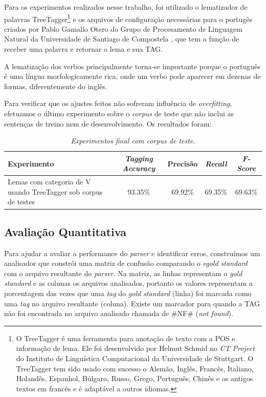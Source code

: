 Para os experimentos realizados nesse trabalho, foi utilizado o lematizador de palavras TreeTagger\footnote{O TreeTagger é uma ferramenta para anotação de texto com a POS e informação de lema. Ele foi desenvolvido por Helmut Schmid no \emph{CT Project} do Instituto de Linguística Computacional da Universidade de Stuttgart. O TreeTagger tem sido usado com sucesso o Alemão, Inglês, Francês, Italiano, Holandês, Espanhol, Búlgaro, Russo, Grego, Português, Chinês e os antigos textos em francês e é adaptável a outros idiomas.} \cite{treetagger} e os arquivos de configuração necessárias para o portugês criados por Pablo Gamallo Otero do Grupo de Procesamento de Linguagem Natural da Universidade de Santiago de Compostela \cite{gamallootero}, que tem a função de receber uma palavra e retornar o lema e sua TAG.

A lematização dos verbos principalmente torna-se importante porque o português é uma língua morfologicamente rica, onde um verbo pode aparecer em dezenas de formas, diferentemente do inglês.

Para verificar que os ajustes feitos não sofreram influência de \emph{overfitting}, efetuamos o último experimento sobre o \emph{corpus} de teste que não inclui as sentenças de treino nem de desenvolvimento. Os resultados foram:

\begin{table}[H]
\centering
\footnotesize
\caption{\it Experimentos final com \emph{corpus} de teste.}
	\begin{tabular}{|p{7cm}|c|c|c|c|}
		\hline
		\textbf{Experimento} &  \textbf{\emph{Tagging Accuracy}} & \textbf{Precisão} & \textbf{\emph{Recall}} & \textbf{\emph{F-Score}} \\
		\hline
		Lemas com categoria de V usando TreeTagger sob corpus de testes & 93.35\% & 69.92\% & 69.35\% & 69.63\%\\
		\hline		
	\end{tabular}
	\label{tab:experimento_corpus_teste}
\end{table}

\subsection{Avaliação Quantitativa}

Para ajudar a avaliar a performance do \emph{parser} e identificar erros, construímos um analisador que constrói uma matriz de confusão comparando o \emph{egold standard} com o arquivo resultante do \emph{parser}. Na matriz, as linhas representam o \emph{gold standard} e as colunas os arquivos analisados, portanto os valores representam a porcentagem das vezes que uma \emph{tag} do \emph{gold standard} (linha) foi marcada como uma \emph{tag} no arquivo resultante (coluna). Existe um marcador para quando a TAG não foi encontrada no arquivo analisado chamada de {\#NF\#} (\emph{not found}). 

